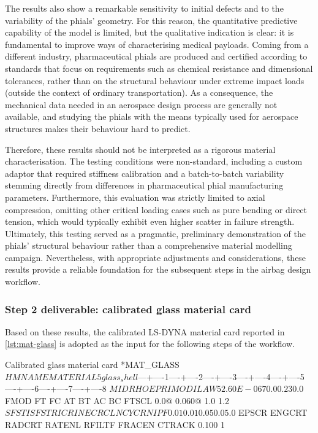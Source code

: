 The results also show a remarkable sensitivity to initial defects and to the variability of the phials' geometry. For this reason, the quantitative predictive capability of the model is limited, but the qualitative indication is clear: it is fundamental to improve ways of characterising medical payloads. Coming from a different industry, pharmaceutical phials are produced and certified according to standards that focus on requirements such as chemical resistance and dimensional tolerances, rather than on the structural behaviour under extreme impact loads (outside the context of ordinary transportation). As a consequence, the mechanical data needed in an aerospace design process are generally not available, and studying the phials with the means typically used for aerospace structures makes their behaviour hard to predict.

Therefore, these results should not be interpreted as a rigorous material characterisation. The testing conditions were non-standard, including a custom adaptor that required stiffness calibration and a batch-to-batch variability stemming directly from differences in pharmaceutical phial manufacturing parameters. Furthermore, this evaluation was strictly limited to axial compression, omitting other critical loading cases such as pure bending or direct tension, which would typically exhibit even higher scatter in failure strength. Ultimately, this testing served as a pragmatic, preliminary demonstration of the phials' structural behaviour rather than a comprehensive material modelling campaign. Nevertheless, with appropriate adjustments and considerations, these results provide a reliable foundation for the subsequent steps in the airbag design workflow.


\subsubsection{Step 2 deliverable: calibrated glass material card}
Based on these results, the calibrated LS-DYNA material card reported in \cref{lst:mat-glass} is adopted as the input for the following steps of the workflow.

\begin{dynacard}[label=lst:mat-glass]{Calibrated glass material card}
*MAT_GLASS
$HMNAME MATERIAL         5glass_shell
$---+----1----+----2----+----3----+----4----+----5----+----6----+----7----+----8
$      MID       RHO         E        PR                          IMOD      ILAW
         5  2.60E-06      70.0      0.23                                     0.0
$     FMOD        FT        FC        AT        BT        AC        BC     FTSCL
       0.0@     0.060@       1.0                                               1.2
$    SFSTI     SFSTR     ICRIN     ECRCL     NCYCR      NIPF
      0.01      0.01       0.0                50.0       5.0
$    EPSCR    ENGCRT    RADCRT    RATENL    RFILTF    FRACEN    CTRACK
     0.100                                                           1
\end{dynacard}

\FloatBarrier %





